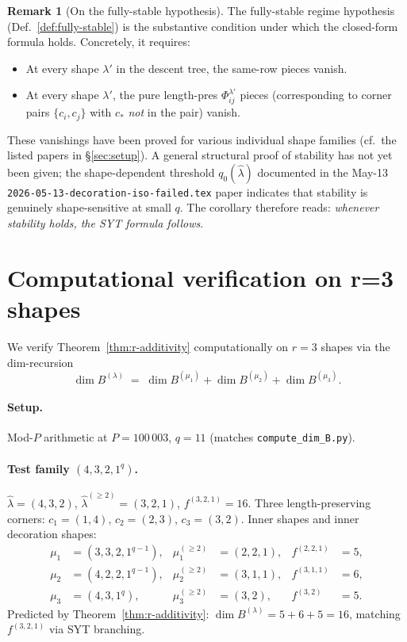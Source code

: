 \documentclass[11pt]{article}
\theoremstyle{definition}
\newtheorem{remark}[theorem]{Remark}
\begin{document}
\begin{remark}[On the fully-stable hypothesis]\label{rem:stability}
The fully-stable regime hypothesis (Def.~\ref{def:fully-stable}) is
the substantive condition under which the closed-form formula holds.
Concretely, it requires:
\begin{itemize}[leftmargin=2em,topsep=0.2em,itemsep=0.1em]
\item At every shape $\lambda'$ in the descent tree, the
   same-row pieces vanish.
\item At every shape $\lambda'$, the pure length-pres
   $\Phi_{ij}^{\lambda'}$ pieces (corresponding to corner pairs
   $\{c_i, c_j\}$ with $c_*$ \emph{not} in the pair) vanish.
\end{itemize}
These vanishings have been proved for various individual shape
families (cf.~the listed papers in \S\ref{sec:setup}). A general
structural proof of stability has not yet been given; the
shape-dependent threshold $q_0(\widehat\lambda)$ documented in the
May-13 \texttt{2026-05-13-decoration-iso-failed.tex} paper indicates
that stability is genuinely shape-sensitive at small $q$.
The corollary therefore reads:
\emph{whenever stability holds, the SYT formula follows}.
\end{remark}

\section{Computational verification on r=3 shapes}\label{sec:verify}

We verify Theorem~\ref{thm:r-additivity} computationally on $r = 3$
shapes via the dim-recursion
\[
   \dim B^{(\lambda)} \;=\;
   \dim B^{(\mu_1)} + \dim B^{(\mu_2)} + \dim B^{(\mu_3)}.
\]

\paragraph{Setup.} Mod-$P$ arithmetic at $P = 100\,003$, $q = 11$
(matches \texttt{compute\_dim\_B.py}).

\paragraph{Test family $(4, 3, 2, 1^q)$.}
$\hat\lambda = (4, 3, 2)$, $\hat\lambda^{(\ge 2)} = (3, 2, 1)$,
$f^{(3,2,1)} = 16$. Three length-preserving corners:
$c_1 = (1, 4)$, $c_2 = (2, 3)$, $c_3 = (3, 2)$. Inner shapes
and inner decoration shapes:
\begin{align*}
   \mu_1 &= (3, 3, 2, 1^{q-1}), & \mu_1^{(\ge 2)} &= (2, 2, 1), & f^{(2,2,1)} &= 5,\\
   \mu_2 &= (4, 2, 2, 1^{q-1}), & \mu_2^{(\ge 2)} &= (3, 1, 1), & f^{(3,1,1)} &= 6,\\
   \mu_3 &= (4, 3, 1^{q}),       & \mu_3^{(\ge 2)} &= (3, 2),   & f^{(3,2)}   &= 5.
\end{align*}
Predicted by Theorem~\ref{thm:r-additivity}: $\dim B^{(\lambda)} = 5 + 6 + 5 = 16$, matching $f^{(3,2,1)}$ via SYT branching.
\end{document}
